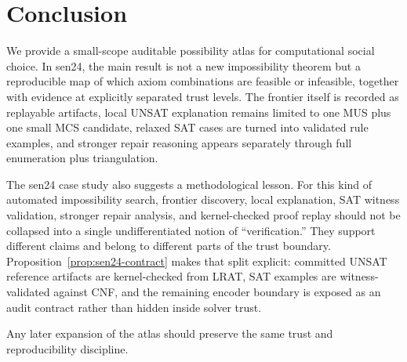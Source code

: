 \section{Conclusion}

We provide a small-scope auditable possibility atlas for computational social choice.
In sen24, the main result is not a new impossibility theorem but a reproducible map of which axiom combinations are feasible or infeasible, together with evidence at explicitly separated trust levels.
The frontier itself is recorded as replayable artifacts, local UNSAT explanation remains limited to one MUS plus one small MCS candidate, relaxed SAT cases are turned into validated rule examples, and stronger repair reasoning appears separately through full enumeration plus triangulation.

The sen24 case study also suggests a methodological lesson.
For this kind of automated impossibility search, frontier discovery, local explanation, SAT witness validation, stronger repair analysis, and kernel-checked proof replay should not be collapsed into a single undifferentiated notion of ``verification.''
They support different claims and belong to different parts of the trust boundary.
Proposition~\ref{prop:sen24-contract} makes that split explicit: committed UNSAT reference artifacts are kernel-checked from LRAT, SAT examples are witness-validated against CNF, and the remaining encoder boundary is exposed as an audit contract rather than hidden inside solver trust.

Any later expansion of the atlas should preserve the same trust and reproducibility discipline.
